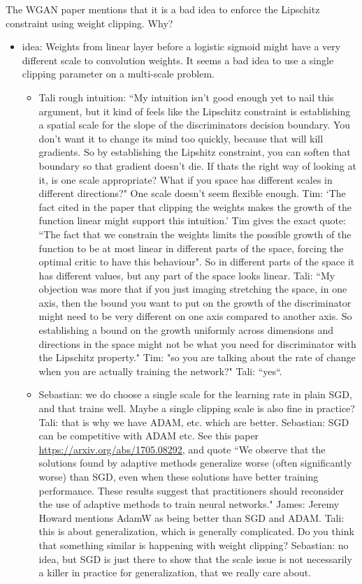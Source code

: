 \documentclass{article}
\begin{document}
	The WGAN paper mentions that it is a bad idea to enforce the Lipschitz constraint using weight clipping. Why?
	\begin{itemize}
		\item idea: Weights from linear layer before a logistic sigmoid might have a very different scale to convolution weights. It seems a bad idea to use a single clipping parameter on a multi-scale problem.
		\begin{itemize}
			\item Tali rough intuition: ``My intuition isn't good enough yet to nail this argument, but it kind of feels like the Lipschitz constraint is establishing a spatial scale for the slope of the discriminators decision boundary. You don't want it to change its mind too quickly, because that will kill gradients. So by establishing the Lipshitz constraint, you can soften that boundary so that gradient doesn't die. If thats the right way of looking at it, is one scale appropriate? What if you space has different scales in different directions?" One scale doesn't seem flexible enough. Tim: `The fact cited in the paper that clipping the weights makes the growth of the function linear might support this intuition.' Tim gives the exact quote: ``The fact that we constrain the weights limits the possible growth of the function to be at most linear in different parts of the space, forcing the optimal critic to have this behaviour". So in different parts of the space it has different values, but any part of the space looks linear. Tali: ``My objection was more that if you just imaging stretching the space, in one axis, then the bound you want to put on the growth of the discriminator might need to be very different on one axis compared to another axis. So establishing a bound on the growth uniformly across dimensions and directions in the space might not be what you need for discriminator with the Lipschitz property." Tim: "so you are talking about the rate of change when you are actually training the network?" Tali: ``yes``.
			\item Sebastian: we do choose a single scale for the learning rate in plain SGD, and that trains well. Maybe a single clipping scale is also fine in practice? Tali: that is why we have ADAM, etc. which are better. Sebastian: SGD can be competitive with ADAM etc. See this paper \url{https://arxiv.org/abs/1705.08292}, and quote ``We observe that the solutions found by adaptive methods generalize worse (often significantly worse) than SGD, even when these solutions have better training performance. These results suggest that practitioners should reconsider the use of adaptive methods to train neural networks." James: Jeremy Howard mentions AdamW as being better than SGD and ADAM. Tali: this is about generalization, which is generally complicated. Do you think that something similar is happening with weight clipping? Sebastian: no idea, but SGD is just there to show that the scale issue is not necessarily a killer in practice for generalization, that we really care about.
			

\end{itemize}
\end{itemize}
\end{document}
